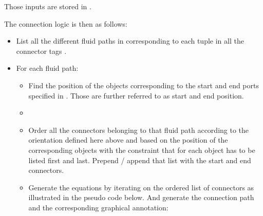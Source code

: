 \documentclass[letterpaper,10pt, openany,english]{sphinxmanual}
\begin{document}
Those inputs are stored in .

The connection logic is then as follows:
\begin{itemize}
\item {} 
List all the different fluid paths in  corresponding to each tuple  in all the connector tags .

\item {} 
For each fluid path:
\begin{itemize}
\item {} 
Find the position of the objects corresponding to the start and end ports specified in . Those are further referred to as start and end position.

\item {} 


\item {} 
Order all the connectors belonging to that fluid path according to the orientation defined here above and based on the position of the corresponding objects with the constraint that for each object  has to be listed first and  last. Prepend / append that list with the start and end connectors.

\item {} 
Generate the  equations by iterating on the ordered list of connectors as illustrated in the pseudo code below. And generate the connection path and the corresponding graphical annotation:


\end{itemize}
\end{itemize}
\end{document}
